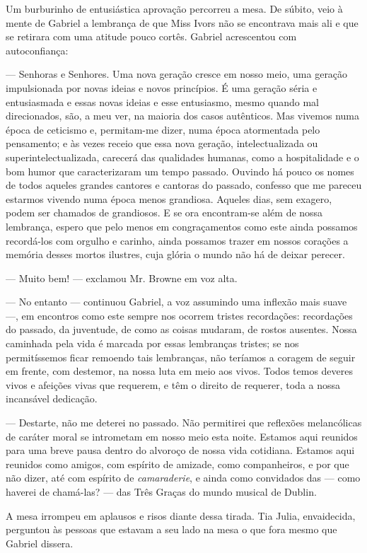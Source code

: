Um burburinho de entusiástica aprovação percorreu a mesa. De súbito,
veio à mente de Gabriel a lembrança de que Miss Ivors não se
encontrava mais ali e que se retirara com uma atitude pouco cortês.
Gabriel acrescentou com autoconfiança:

--- Senhoras e Senhores. Uma nova geração cresce em nosso meio, uma
geração impulsionada por novas ideias e novos princípios. É uma
geração séria e entusiasmada e essas novas ideias e esse entusiasmo,
mesmo quando mal direcionados, são, a meu ver, na maioria dos casos
autênticos. Mas vivemos numa época de ceticismo e, permitam-me dizer,
numa época atormentada pelo pensamento; e às vezes receio que essa
nova geração, intelectualizada ou superintelectualizada, carecerá
das qualidades humanas, como a hospitalidade e o bom humor que
caracterizaram um tempo passado. Ouvindo há pouco os nomes de todos
aqueles grandes cantores e cantoras do passado, confesso que me
pareceu estarmos vivendo numa época menos grandiosa. Aqueles dias,
sem exagero, podem ser chamados de grandiosos. E se ora encontram-se
além de nossa lembrança, espero que pelo menos em congraçamentos como
este ainda possamos recordá-los com orgulho e carinho, ainda
possamos trazer em nossos corações a memória desses mortos ilustres,
cuja glória o mundo não há de deixar perecer.

--- Muito bem! --- exclamou Mr. Browne em voz alta.

--- No entanto --- continuou Gabriel, a voz assumindo uma inflexão
mais suave ---, em encontros como este sempre nos ocorrem tristes
recordações: recordações do passado, da juventude, de como as coisas
mudaram, de rostos ausentes. Nossa caminhada pela vida é marcada por
essas lembranças tristes; se nos permitíssemos ficar remoendo tais
lembranças, não teríamos a coragem de seguir em frente, com destemor,
na nossa luta em meio aos vivos. Todos temos deveres vivos e afeições
vivas que requerem, e têm o direito de requerer, toda a nossa
incansável dedicação.

--- Destarte, não me deterei no passado. Não permitirei que reflexões
melancólicas de caráter moral se intrometam em nosso
meio esta noite. Estamos aqui reunidos para uma breve pausa dentro do
alvoroço de nossa vida cotidiana. Estamos aqui reunidos como amigos,
com espírito de amizade, como companheiros, e por que não dizer, até
com espírito de \textit{camaraderie}, e ainda como convidados das --- como
haverei de chamá-las? --- das Três Graças do mundo musical de Dublin.

A mesa irrompeu em aplausos e risos diante dessa tirada. Tia
Julia, envaidecida, perguntou às pessoas que estavam a seu lado na
mesa o que fora mesmo que Gabriel dissera.

